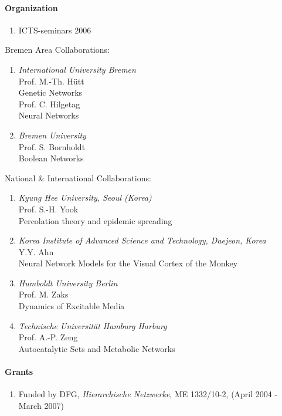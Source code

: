 \paragraph{Organization}
\begin{enumerate}
\item  ICTS-seminars 2006
\end{enumerate}

%
Bremen Area Collaborations:
\begin{enumerate}
\item {\sl International University Bremen}\\Prof. M.-Th. H\"utt\\Genetic Networks
\\Prof. C. Hilgetag\\Neural Networks
\item {\sl Bremen University} \\Prof. S. Bornholdt\\Boolean Networks
\end{enumerate}

National \& International Collaborations:
\begin{enumerate}
\item {\sl Kyung Hee University, Seoul (Korea)}\\ Prof. S.-H.
Yook\\ Percolation theory and epidemic spreading
\item{\sl Korea Institute of Advanced Science and Technology, Daejeon,
Korea}\\Y.Y. Ahn\\ Neural Network Models for the Visual
Cortex of the Monkey
\item{\sl Humboldt University Berlin}\\Prof. M. Zaks\\ Dynamics of Excitable Media
\item {\sl Technische Universit\"at Hamburg Harburg}\\ Prof. A.-P. Zeng\\ Autocatalytic Sets and Metabolic Networks
\end{enumerate}


\paragraph{Grants}
\begin{enumerate}
\item Funded by DFG,  \emph{Hierarchische Netzwerke}, ME
1332/10-2, (April 2004 - March 2007)
\end{enumerate}

